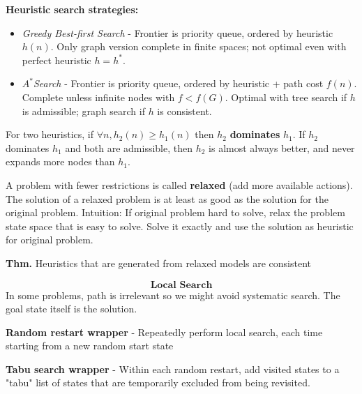 \documentclass[a4paper,10pt,twocolumn]{article}
\begin{document}
\begin{tcolorbox}[title=Heuristic Search, module]
    \textbf{Heuristic search strategies:}
    \begin{itemize}
        \item \textit{Greedy Best-first Search} - Frontier is priority queue, ordered by heuristic $h(n)$. Only graph version complete in finite spaces; not optimal even with perfect heuristic $h = h^*$.
        \item $A^*$\textit{Search} - Frontier is priority queue, ordered by heuristic + path cost $f(n)$. Complete unless infinite nodes with $f < f(G)$. Optimal with tree search if $h$ is admissible; graph search if $h$ is consistent.
    \end{itemize}

    For two heuristics, if $\forall n, h_2(n) \ge h_1(n)$ then $h_2$ \textbf{dominates} $h_1$. If $h_2$ dominates $h_1$ and both are admissible, then $h_2$ is almost always better, and never expands more nodes than $h_1$.

    A problem with fewer restrictions is called \textbf{relaxed} (add more available actions). The solution of a relaxed problem is at least as good as the solution for the original problem. Intuition: If original problem hard to solve, relax the problem state space that is easy to solve. Solve it exactly and use the solution as heuristic for original problem.

    \textbf{Thm. } Heuristics that are generated from relaxed models are consistent

    \vspace{-0.5em}
    \[\textbf{Local Search}\]
    In some problems, path is irrelevant so we might avoid systematic search. The goal state itself is the solution.

    \textbf{Random restart wrapper} - Repeatedly perform local search, each time starting from a new random start state

    \textbf{Tabu search wrapper} - Within each random restart, add visited states to a "tabu" list of states that are temporarily excluded from being revisited.


\end{tcolorbox}
\end{document}
